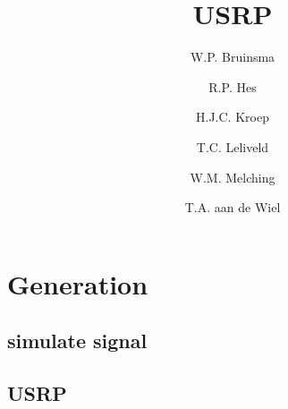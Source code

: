 \documentclass[report, oneside, a4paper, openany]{memoir}
\title{USRP}
\author{W.P. Bruinsma \and R.P. Hes \and H.J.C. Kroep \and T.C. Leliveld \and W.M. Melching \and T.A. aan de Wiel}
\begin{document}
\chapter{Generation}

\section{simulate signal}

\section{USRP}
\end{document}
